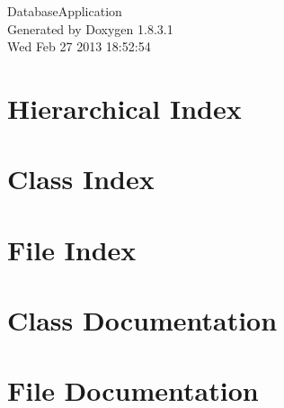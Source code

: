 \documentclass{book}
\begin{document}
\hypersetup{pageanchor=false,citecolor=blue}
\begin{titlepage}
\vspace*{7cm}
\begin{center}
{\Large Database\-Application }\\
\vspace*{1cm}
{\large Generated by Doxygen 1.8.3.1}\\
\vspace*{0.5cm}
{\small Wed Feb 27 2013 18:52:54}\\
\end{center}
\end{titlepage}
\clearemptydoublepage
{}
\tableofcontents
\clearemptydoublepage
{}
\hypersetup{pageanchor=true,citecolor=blue}
\chapter{Hierarchical Index}

\chapter{Class Index}

\chapter{File Index}

\chapter{Class Documentation}

















\chapter{File Documentation}

\printindex
\end{document}
